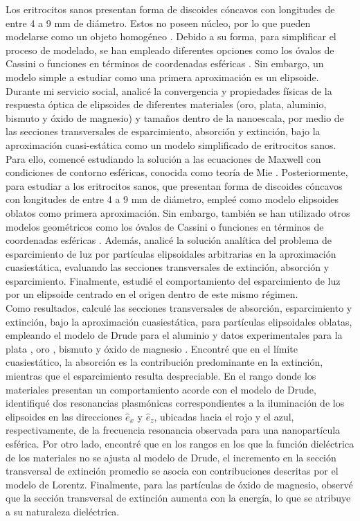 \documentclass[9pt,letterpaper]{article}
\begin{document}
Los eritrocitos sanos presentan forma de discoides cóncavos con longitudes de entre 4 a 9 mm de diámetro. Estos no poseen núcleo, por lo que pueden modelarse como un objeto homogéneo \cite{Cassini}. Debido a su forma, para simplificar el proceso de modelado, se han empleado diferentes opciones como los óvalos de Cassini \cite{Cassini} o funciones en términos de coordenadas esféricas \cite{Esferico}. Sin embargo, un modelo simple a estudiar como una primera aproximación es un elipsoide. Durante mi servicio social, analicé la convergencia y propiedades físicas de la respuesta óptica de elipsoides de diferentes materiales (oro, plata, aluminio, bismuto y óxido de magnesio) y tamaños dentro de la nanoescala, por medio de las secciones transversales de esparcimiento, absorción y extinción, bajo la aproximación cuasi-estática como un modelo simplificado de eritrocitos sanos. Para ello, comencé estudiando la solución a las ecuaciones de Maxwell con condiciones de contorno esféricas, conocida como teoría de Mie \cite{Bohren}. Posteriormente, para estudiar a los eritrocitos sanos, que presentan forma de discoides cóncavos con longitudes de entre 4 a 9 mm de diámetro, empleé como modelo elipsoides oblatos como primera aproximación. Sin embargo, también se han utilizado otros modelos geométricos como los óvalos de Cassini \cite{Cassini} o funciones en términos de coordenadas esféricas \cite{Esferico}. Además, analicé la solución analítica del problema de esparcimiento de luz por partículas elipsoidales arbitrarias en la aproximación cuasiestática, evaluando las secciones transversales de extinción, absorción y esparcimiento. Finalmente, estudié el comportamiento del esparcimiento de luz por un elipsoide centrado en el origen dentro de este mismo régimen.\\

Como resultados, calculé las secciones transversales de absorción, esparcimiento y extinción, bajo la aproximación cuasiestática, para partículas elipsoidales oblatas, empleando el modelo de Drude para el aluminio \cite{Plata} y datos experimentales para la plata \cite{Plata}, oro \cite{Plata}, bismuto \cite{Bismuto} y óxido de magnesio \cite{MgO}. Encontré que en el límite cuasiestático, la absorción es la contribución predominante en la extinción, mientras que el esparcimiento resulta despreciable. En el rango donde los materiales presentan un comportamiento acorde con el modelo de Drude, identifiqué dos resonancias plasmónicas correspondientes a la iluminación de los elipsoides en las direcciones $\hat{e}_x$ y $\hat{e}_z$, ubicadas hacia el rojo y el azul, respectivamente, de la frecuencia resonancia observada para una nanopartícula esférica. Por otro lado, encontré que en los rangos en los que la función dieléctrica de los materiales no se ajusta al modelo de Drude, el incremento en la sección transversal de extinción promedio se asocia con contribuciones descritas por el modelo de Lorentz. Finalmente, para las partículas de óxido de magnesio, observé que la sección transversal de extinción aumenta con la energía, lo que se atribuye a su naturaleza dieléctrica. \\
\end{document}
